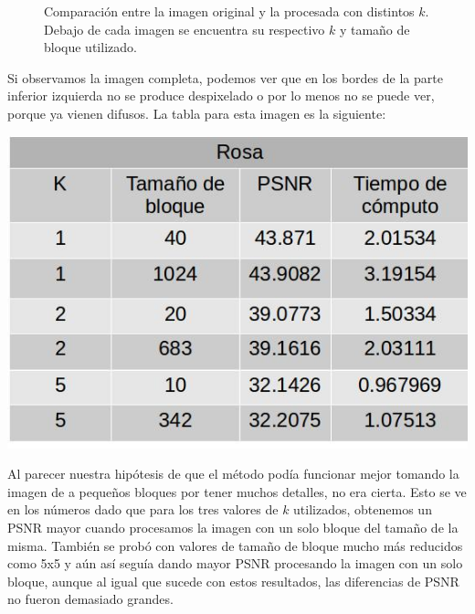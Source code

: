 \documentclass[a4paper]{article}
\begin{document}
\begin{figure}[H]
{}
\caption{Comparación entre la imagen original y la procesada con distintos $k$. Debajo de cada imagen se encuentra su respectivo $k$ y tamaño de bloque utilizado.}
\end{figure}

Si observamos la imagen completa, podemos ver que en los bordes de la parte inferior izquierda no se produce despixelado o por lo menos no se puede ver, porque ya vienen difusos. La tabla para esta imagen es la siguiente:
\newline

\centerline{
\includegraphics[scale=0.5]{imagenes/rosaTabla.jpg}
}

Al parecer nuestra hipótesis de que el método podía funcionar mejor tomando la imagen de a pequeños bloques por tener muchos detalles, no era cierta. Esto se ve en los números dado que para los tres valores de $k$ utilizados, obtenemos un PSNR mayor cuando procesamos la imagen con un solo bloque del tamaño de la misma. También se probó con valores de tamaño de bloque mucho más reducidos como 5x5 y aún así seguía dando mayor PSNR procesando la imagen con un solo bloque, aunque al igual que sucede con estos resultados, las diferencias de PSNR no fueron demasiado grandes.
\end{document}
